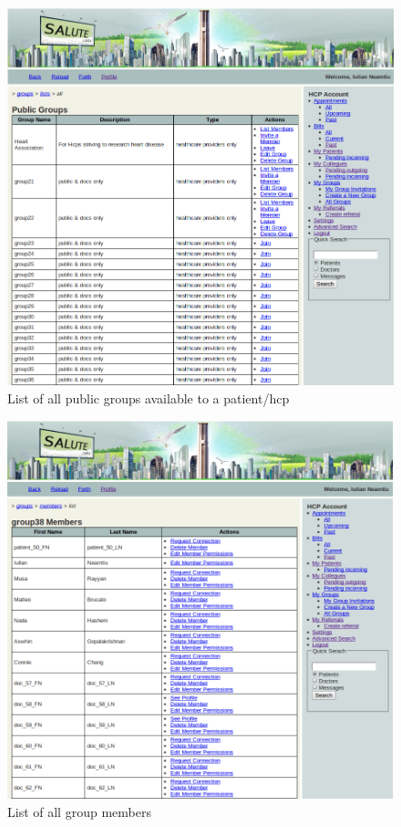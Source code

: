 \begin{figure}
\includegraphics[scale=0.5]{screenshots/all_public_groups.png}
\caption{List of all public groups available to a patient/hcp}
\end{figure}

\begin{figure}
\includegraphics[scale=0.5]{screenshots/list_group_members.png}
\caption{List of all group members}
\end{figure}

